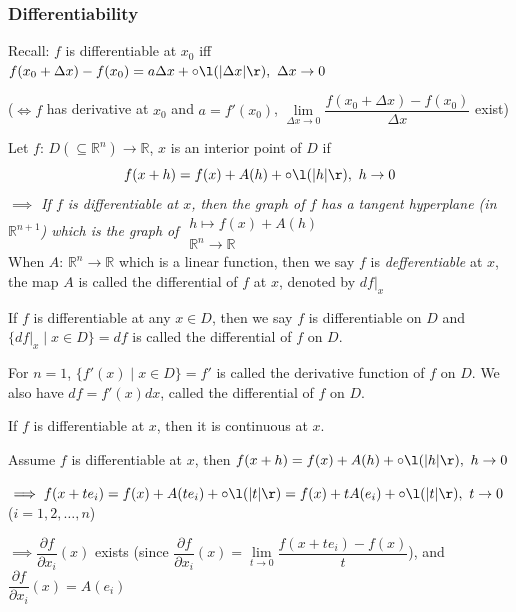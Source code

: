 \subsubsection[多变量函数的可微性]{Differentiability}

Recall: $f$ is differentiable at $x_0$ iff $f(x_0+\Delta x)-f(x_0)=a\Delta x+\circ\l(\lvert\Delta x\rvert\r),\ \Delta x\to 0$

($\iff f$ has derivative at $x_0$ and $a=f'(x_0)$, $\lim\limits_{\Delta x\to 0}\dfrac{f(x_0+\Delta x)-f(x_0)}{\Delta x}$ exist)

\begin{definition}
    Let $f:\,D(\subseteq\mathbb{R}^n)\to\mathbb{R}$, $x$ is an interior point of $D$ if
    $$
        f(x+h)=f(x)+A(h)+\circ\l(\lvert h\rvert\r),\ h\to0
    $$
    \emph{$\implies$ If $f$ is differentiable at $x$, then the graph of $f$ has a tangent \emph{hyperplane} (in $\mathbb{R}^{n+1}$) which is the graph of $\substack{h\mapsto f(x)+A(h)\\\mathbb{R}^n\to\mathbb{R}}$}\\
    When $A:\,\mathbb{R}^n\to\mathbb{R}$ which is a linear function, then we say $f$ is \emph{defferentiable} at $x$, the map $A$ is called the differential of $f$ at $x$, denoted by $df|_x$

    If $f$ is differentiable at any $x\in D$, then we say $f$ is differentiable on $D$ and $\{df|_x\mid x\in D\}=df$ is called the differential of $f$ on $D$.
\end{definition}

\begin{remark}
    For $n=1$, $\{f'(x)\mid x\in D\}=f'$ is called the derivative function of $f$ on $D$. We also have $df=f'(x)dx$, called the differential of $f$ on $D$.
\end{remark}

\begin{theorem}
    If $f$ is differentiable at $x$, then it is continuous at $x$.
\end{theorem}

Assume $f$ is differentiable at $x$, then $f(x+h)=f(x)+A(h)+\circ\l(\lvert h\rvert\r),\ h\to0$

$\implies f(x+te_i)=f(x)+A(te_i)+\circ\l(\lvert t\rvert\r)=f(x)+tA(e_i)+\circ\l(\lvert t\rvert\r),\ t\to0$ ($i=1,2,\dots,n$)

$\implies \dfrac{\partial f}{\partial x_i}(x)$ exists (since $\dfrac{\partial f}{\partial x_i}(x)=\lim\limits_{t\to 0}\dfrac{f(x+te_i)-f(x)}{t}$), and $\dfrac{\partial f}{\partial x_i}(x)=A(e_i)$

